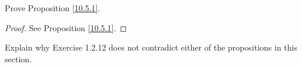 \exercisesection

\begin{exercise}\label{ex 10.5.1}
    Prove Proposition \ref{10.5.1}.
\end{exercise}

\begin{proof}
    See Proposition \ref{10.5.1}.
\end{proof}

\begin{exercise}\label{ex 10.5.2}
    Explain why Exercise 1.2.12 does not contradict either of the propositions in this section.
\end{exercise}
